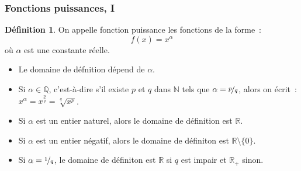 \documentclass[10pt,notheorems]{beamer}
\theoremstyle{plain}
\theoremstyle{definition} %
\newtheorem{definition}{Définition}
\begin{document}
\begin{frame}
  \frametitle{Fonctions puissances, I}
  \hypertarget{slide_fonctions_puissance_1}{}

  \bigskip

  \begin{definition}
    On appelle fonction puissance les fonctions de la forme~:
    \[
      f(x) = x^{\alpha}
    \]
    où $\alpha$ est une constante réelle.
  \end{definition}

  \bigskip

  \begin{itemize}

  \item Le domaine de défnition dépend de $\alpha$.\newline

  \item Si $\alpha\in\mathbb Q$, c'est-à-dire s'il existe $p$ et $q$ dans $\mathbb N$ tels que $\alpha=\nicefrac{p}{q}$, alors on écrit~: $x^{\alpha} = x^{\frac{p}{q}} = \sqrt[q]{x^p}$.\newline

  \item Si $\alpha$ est un entier naturel, alors le domaine de définition est $\mathbb R$.

  \item Si $\alpha$ est un entier négatif, alors le domaine de définiton est $\mathbb R\setminus \{0\}$.

  \item Si $\alpha=\nicefrac{1}{q}$, le domaine de définiton est $\mathbb R$ si $q$ est impair et $\mathbb R_+$ sinon.

  \end{itemize}

\end{frame}
\end{document}
